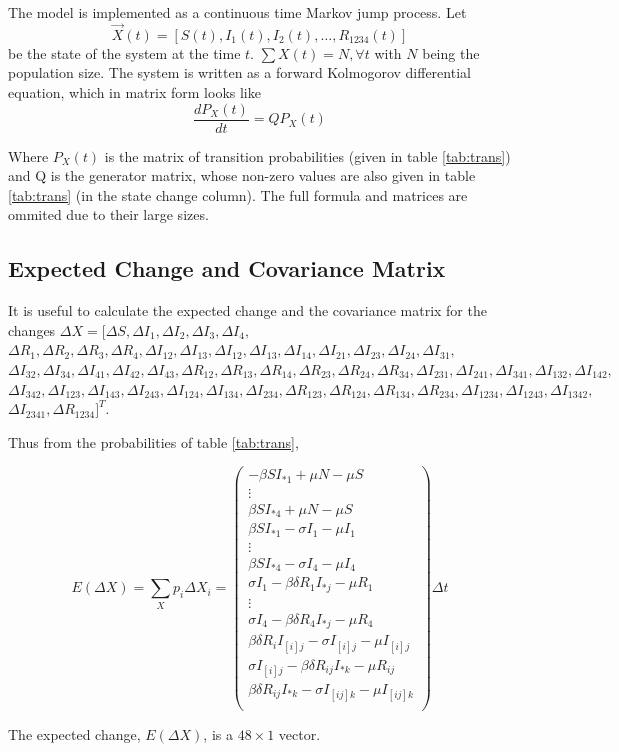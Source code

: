 \documentclass[12pt]{article}
\begin{document}
The model is implemented as a continuous time Markov jump process. Let
$$\overrightarrow{X}(t) = [S(t), I_1(t), I_2(t), \ldots, R_{1234}(t)]$$ 
be the 
state of the system at the time $t$. $\sum X(t) = N, \forall t$ with $N$ being 
the population size. 
The system is written as a forward Kolmogorov differential equation, which in 
matrix form looks like
\begin{equation}
\frac{dP_X(t)}{dt} = Q P_X(t) 
\end{equation}

Where $P_X(t)$ is  the matrix of transition probabilities (given in table 
\ref{tab:trans}) and Q is the generator matrix, whose non-zero values are also 
given in table \ref{tab:trans} (in the state change column). The full formula 
and matrices are ommited due to their large sizes.

\subsection*{Expected Change and Covariance Matrix}

It is useful to calculate the expected change and the covariance matrix for the 
changes $\Delta X = [\Delta S, \Delta I_1, \Delta I_2, \Delta I_3, \Delta I_4,$
$\Delta R_1, \Delta R_2, \Delta R_3, \Delta R_4,\Delta I_{12}, \Delta I_{13},
\Delta I_{12}, \Delta I_{13}, 
\Delta I_{14}, \Delta I_{21}, \Delta I_{23}, \Delta I_{24}, \Delta I_{31},$
$\Delta I_{32}, 
\Delta I_{34}, \Delta I_{41}, \Delta I_{42}, \Delta I_{43}, \Delta R_{12}, 
\Delta R_{13}, \Delta R_{14}, \Delta R_{23}, \Delta R_{24}, \Delta R_{34},
\Delta I_{231}, \Delta I_{241}, \Delta I_{341}, \Delta I_{132}, \Delta I_{142},$
$\Delta I_{342}, \Delta I_{123}, \Delta I_{143}, \Delta I_{243}, \Delta I_{124},
\Delta I_{134}, \Delta I_{234}, \Delta R_{123}, \Delta R_{124}, \Delta R_{134},
\Delta R_{234}, \Delta I_{1234}, \Delta I_{1243}, \Delta I_{1342},$\\
$\Delta I_{2341},\Delta R_{1234}]^T$.


Thus from the probabilities of table \ref{tab:trans},

\begin{equation}
 E(\Delta X)=\sum_X p_i \Delta X_i=
\begin{pmatrix}
-\beta S I_{*1} + \mu N -\mu S\\
\vdots\\
\beta S I_{*4} + \mu N -\mu S\\
\beta S I_{*1} -\sigma I_1 -\mu I_1\\
\vdots\\
\beta S I_{*4} -\sigma I_4 -\mu I_4\\
\sigma I_1 - \beta \delta R_1 I_{*j} -\mu R_1\\
\vdots\\
\sigma I_4 - \beta \delta R_4 I_{*j} -\mu R_4\\
\beta \delta R_i I_{[i]j} - \sigma I_{[i]j} -\mu I_{[i]j}\\ 
\sigma I_{[i]j} - \beta \delta R_{ij} I_{*k} - \mu R_{ij}\\
\beta \delta R_{ij} I_{*k} -\sigma I_{[ij]k} -\mu I_{[ij]k}\\ 
 \end{pmatrix}
 \Delta t
\end{equation}

The expected change, $E(\Delta X)$, is a $48\times 1$ vector.
%
\end{document}
